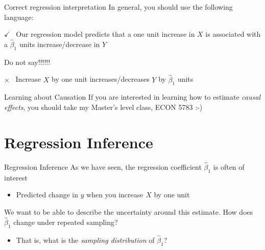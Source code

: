 \documentclass[aspectratio=169,t,11pt,table]{beamer}
\begin{document}
\begin{frame}{Correct regression interpretation}
  In general, you should use the following language:
  
  \begin{tcolorbox}[boxrule = 0pt, frame hidden, sharp corners, enhanced, borderline west = {4pt}{0pt}{green}, interior hidden]
    {\color{green}\Large $\checkmark$\ } Our regression model predicts that a one unit increase in $X$ is associated with a $\hat{\beta}_1$ units increase/decrease in $Y$
  \end{tcolorbox}

  \bigskip
  Do not say!!!!!! 
  \begin{tcolorbox}[boxrule = 0pt, frame hidden, sharp corners, enhanced, borderline west = {4pt}{0pt}{red}, interior hidden]
   {\color{red}\Large $\times$\ } Increase $X$ by one unit increases/decreases $Y$ by $\hat{\beta}_1$ units
  \end{tcolorbox}
\end{frame}

\begin{frame}{Learning about Causation}
  If you are interested in learning how to estimate \emph{causal effects}, you should take my Master's level class, ECON 5783 :-) 
\end{frame}


\section{Regression Inference}

\begin{frame}{Regression Inference}
  As we have seen, the regression coefficient $\hat{\beta}_1$ is often of interest
  \begin{itemize}
    \item Predicted change in $y$ when you increase $X$ by one unit
  \end{itemize}

  \pause
  \bigskip
  We want to be able to describe the uncertainty around this estimate. How does $\hat{\beta}_1$ change under repeated sampling?
  \begin{itemize}
    \item That is, what is the \emph{sampling distribution} of $\hat{\beta}_1$?
  \end{itemize}
\end{frame}

\end{document}
